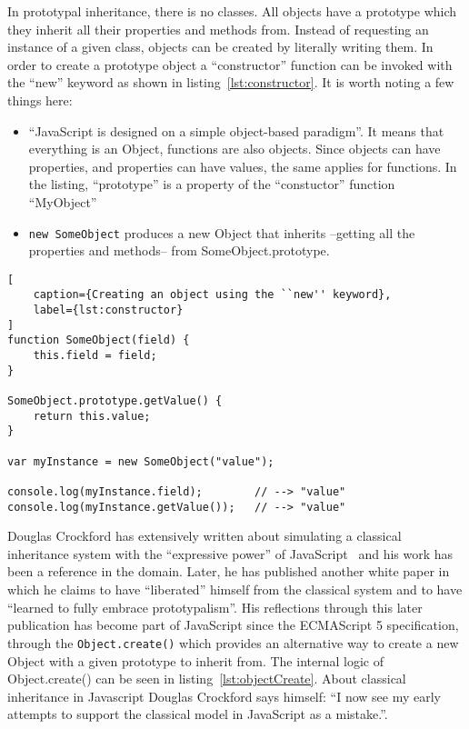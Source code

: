 In prototypal inheritance, there is no classes. All objects have a prototype which they inherit all their properties and methods from. Instead of requesting an instance of a given class, objects can be created by literally writing them. In order to create a prototype object a ``constructor'' function can be invoked with the ``new'' keyword as shown in listing~\ref{lst:constructor}. It is worth noting a few things here:
\begin{itemize}
    \item ``JavaScript is designed on a simple object-based paradigm''\cite{mozilla}. It means that everything is an Object, functions are also objects. Since objects can have properties, and properties can have values, the same applies for functions. In the listing, ``prototype'' is a property of the ``constuctor'' function ``MyObject''
    \item \texttt{new SomeObject} produces a new Object that inherits --getting all the properties and methods-- from SomeObject.prototype.
\end{itemize}

\begin{lstlisting}[
    caption={Creating an object using the ``new'' keyword},
    label={lst:constructor}
]
function SomeObject(field) {
    this.field = field;
}

SomeObject.prototype.getValue() {
    return this.value;
}

var myInstance = new SomeObject("value");

console.log(myInstance.field);        // --> "value"
console.log(myInstance.getValue());   // --> "value"
\end{lstlisting}

Douglas Crockford has extensively written about simulating a classical inheritance system with the ``expressive power'' of JavaScript~\cite{crockford_inheritance} and his work has been a reference in the domain. Later, he has published another white paper in which he claims to have ``liberated'' himself from the classical system and to have ``learned to fully embrace prototypalism''\cite{crockford_prototypal}. His reflections through this later publication has become part of JavaScript since the ECMAScript 5 specification, through the \texttt{Object.create()} which provides an alternative way to create a new Object with a given prototype to inherit from. The internal logic of Object.create() can be seen in listing~\ref{lst:objectCreate}. About classical inheritance in Javascript Douglas Crockford says himself: ``I now see my early attempts to support the classical model in JavaScript as a mistake.''.

